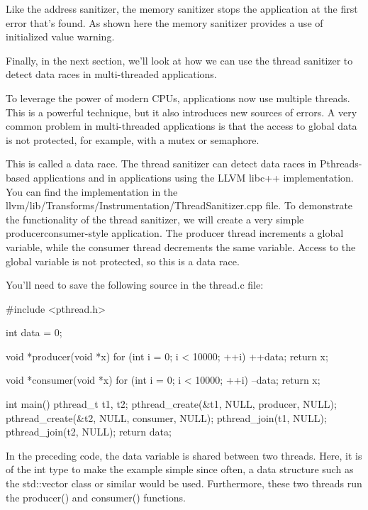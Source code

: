 Like the address sanitizer, the memory sanitizer stops the application at the first error that’s found. As shown here the memory sanitizer provides a use of initialized value warning.

Finally, in the next section, we’ll look at how we can use the thread sanitizer to detect data races in multi-threaded applications.


To leverage the power of modern CPUs, applications now use multiple threads. This is a powerful technique, but it also introduces new sources of errors. A very common problem in multi-threaded applications is that the access to global data is not protected, for example, with a mutex or semaphore.

This is called a data race. The thread sanitizer can detect data races in Pthreads-based applications and in applications using the LLVM libc++ implementation. You can find the implementation in the llvm/lib/Transforms/Instrumentation/ThreadSanitizer.cpp file.
To demonstrate the functionality of the thread sanitizer, we will create a very simple producerconsumer-style application. The producer thread increments a global variable, while the consumer thread decrements the same variable. Access to the global variable is not protected, so this is a data race.

You’ll need to save the following source in the thread.c file:

\begin{cpp}
#include <pthread.h>

int data = 0;

void *producer(void *x) {
    for (int i = 0; i < 10000; ++i) ++data;
    return x;
}

void *consumer(void *x) {
    for (int i = 0; i < 10000; ++i) --data;
    return x;
}

int main() {
    pthread_t t1, t2;
    pthread_create(&t1, NULL, producer, NULL);
    pthread_create(&t2, NULL, consumer, NULL);
    pthread_join(t1, NULL);
    pthread_join(t2, NULL);
    return data;
}
\end{cpp}

In the preceding code, the data variable is shared between two threads. Here, it is of the int type to make the example simple since often, a data structure such as the std::vector class or similar would be used. Furthermore, these two threads run the producer() and consumer() functions.

